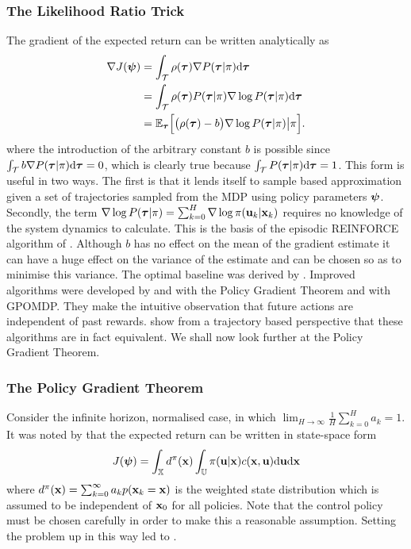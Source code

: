 \subsubsection{The Likelihood Ratio Trick}
The gradient of the expected return can be written analytically as
\begin{align*}
\nabla J(\boldsymbol{\psi}) &= \int_{\mathcal{T}} \rho(\boldsymbol{\tau}) \nabla P(\boldsymbol{\tau}|\pi) \mathrm{d} \boldsymbol{\tau} \\
&= \int_{\mathcal{T}}  \rho(\boldsymbol{\tau}) P(\boldsymbol{\tau}|\pi)\nabla\log P(\boldsymbol{\tau}|\pi) \mathrm{d} \boldsymbol{\tau} \\
&= \mathbb{E}_{\boldsymbol{\tau}} \Big[ \big(\rho(\boldsymbol{\tau}) - b\big) \nabla\log P(\boldsymbol{\tau}|\pi)  \big|\pi \Big].
\end{align*}
where the introduction of the arbitrary constant $b$ is possible since $\int_{\mathcal{T}}b \nabla  P(\boldsymbol{\tau}|\pi) \mathrm{d} \boldsymbol{\tau} = 0$, which is clearly true because $\int_{\mathcal{T}}P(\boldsymbol{\tau}|\pi) \mathrm{d} \boldsymbol{\tau} = 1$. This form is useful in two ways. The first is that it lends itself to sample based approximation given a set of trajectories sampled from the MDP using policy parameters $\boldsymbol{\psi}$. Secondly, the term $\nabla \log P(\boldsymbol{\tau}|\pi) = \sum_{k=0}^H \nabla \log \pi(\mathbf{u}_k|\mathbf{x}_k)$ requires no knowledge of the system dynamics to calculate. 
%
This is the basis of the episodic REINFORCE algorithm of \cite{Wil92}. Although $b$ has no effect on the mean of the gradient estimate it can have a huge effect on the variance of the estimate and can be chosen so as to minimise this variance. The optimal baseline was derived by \cite{PS08}. Improved algorithms were developed by \cite{SMSM00} and \cite{MT01} with the Policy Gradient Theorem and \cite{BB01} with GPOMDP. They make the intuitive observation that future actions are independent of past rewards. \cite{PS08} show from a trajectory based perspective that these algorithms are in fact equivalent. We shall now look further at the Policy Gradient Theorem.

\subsubsection{The Policy Gradient Theorem}
Consider the infinite horizon, normalised case, in which $\lim_{H\rightarrow\infty}\tfrac{1}{H}\sum_{k=0}^H a_k=1$. It was noted by \cite{SMSM00} that the expected return can be written in state-space form
\begin{equation*}
J(\boldsymbol{\psi}) = \int_{\mathbb{X}} d^\pi(\mathbf{x}) \int_{\mathbb{U}} \pi(\mathbf{u}|\mathbf{x}) c(\mathbf{x},\mathbf{u}) \mathrm{d}\mathbf{u}\mathrm{d}\mathbf{x}
\end{equation*}
where $d^\pi(\mathbf{x}) = \sum_{k=0}^\infty a_kp(\mathbf{x}_k=\mathbf{x})$ is the weighted state distribution which is assumed to be independent of $\mathbf{x}_0$ for all policies. Note that the control policy must be chosen carefully in order to make this a reasonable assumption. Setting the problem up in this way led to .


